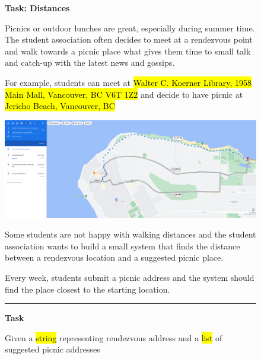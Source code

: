 \begin{figure}
\begin{mdframed}[backgroundcolor=gray!05] 
\begin{scriptsize}

{\large \textbf{Task: Distances}} \bigskip


Picnics or outdoor lunches are great, especially during summer time. The student association often decides to meet at a rendezvous point and walk towards a picnic place what gives them time to small talk and catch-up with the latest news and gossips. \medskip

For example, students can meet at 
{\fontsize{8}{1}\selectfont\color{color_29791} \hl{Walter C. Koerner Library, 1958 Main Mall, Vancouver, BC V6T 1Z2}} 
and decide to have picnic at 
{\fontsize{8}{1}\selectfont\color{color_29791} \hl{Jericho Beach, Vancouver, BC}}  \medskip

\medskip

\includegraphics[width=\textwidth]{appendix/cp6/jericho.png}

\medskip


Some students are not happy with walking distances and the student association wants to build a small system that finds the distance between a rendezvous location and a suggested picnic place.  \medskip

Every week, students submit a picnic address and the system should find the place closest to the starting location. \medskip


\begin{center}
\rule{10cm}{0.4pt}
\end{center}

\textbf{Task} \medskip



Given a {\fontsize{8}{1}\selectfont\color{color_29791} \hl{string}}
representing rendezvous address and a {\fontsize{8}{1}\selectfont\color{color_29791} \hl{list}}
of suggested picnic addresses


\end{scriptsize}
\end{mdframed}
\end{figure}
